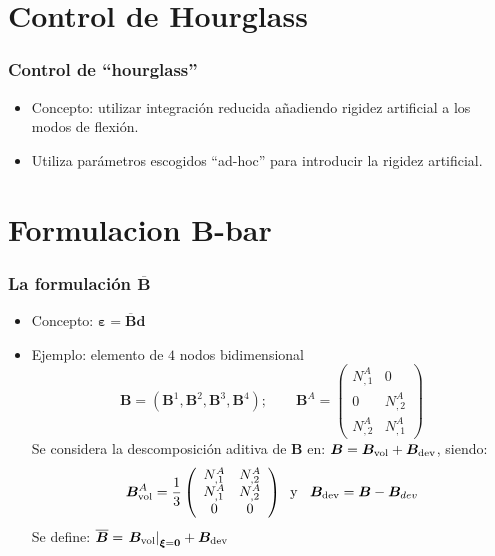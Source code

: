 \documentclass{beamer}
\begin{document}
\section{Control de Hourglass}
\begin{frame}
\frametitle{Control de ``hourglass''}
\begin{itemize}
\item Concepto: utilizar integración reducida añadiendo rigidez artificial a
los modos de flexión.
\item Utiliza parámetros escogidos 
``ad-hoc'' para introducir la rigidez artificial.
\end{itemize}
\end{frame}
\section{Formulacion B-bar}
\begin{frame}
\frametitle{La formulación $\overline{\bm{B}}$}
\begin{itemize}
\item Concepto: $\bm{\varepsilon}=\overline{\bm{B}} \bm{d}$
\item Ejemplo: elemento de $4$ nodos bidimensional
$$\bm{B}=(\bm{B}^{1},\bm{B}^2,\bm{B}^3,\bm{B}^4); \qquad
\bm{B}^{A}=\left(
\begin{array}{cc}
N^{A}_{,1}&0\\
0&N^{A}_{,2}\\
N^{A}_{,2}&N^{A}_{,1}
\end{array}
\right)
$$
Se considera la descomposición aditiva de $\bm{B}$ en:
$\bm{B}=\bm{B}_{\rm vol}+\bm{B}_{\rm dev}$,
siendo:
$$\bm{B}^{A}_{\rm vol}=\frac{1}{3}
\left(
\begin{array}{cc}
N^{A}_{,1}&N^{A}_{,2}\\
N^{A}_{,1}&N^{A}_{,2}\\
0&0
\end{array}
\right)
\;\;\mbox{y }\;\; \bm{B}_{\rm dev}=\bm{B}-\bm{B}_{dev}$$
Se define:
$\overline{\bm{B}}=\left. \bm{B}_{\rm vol}\right|_{\bm{\xi}=\bm{0}}+\bm{B}_{\rm dev}$
\end{itemize}
\end{frame}
\end{document}
